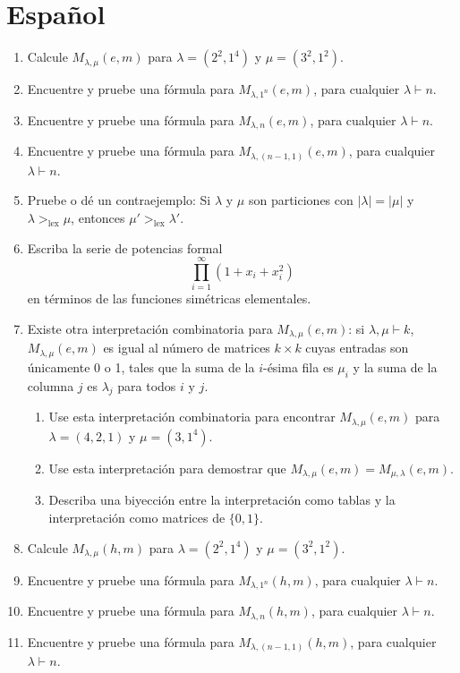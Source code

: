 \documentclass{article}
\begin{document}
\section*{Español}
\begin{enumerate}
\item Calcule $M_{\lambda,\mu}(e,m)$ para $\lambda= (2^2,1^4)$ y $\mu=(3^2,1^2)$.
\item Encuentre y pruebe una fórmula para $M_{\lambda, 1^n}(e,m)$, para cualquier $\lambda \vdash n$.
\item Encuentre y pruebe una fórmula para $M_{\lambda, n}(e,m)$, para cualquier $\lambda \vdash n$.
\item Encuentre y pruebe una fórmula para $M_{\lambda, (n-1,1)}(e,m)$, para cualquier $\lambda \vdash n$.
\item Pruebe o dé un contraejemplo: Si $\lambda$ y $\mu$ son particiones con $|\lambda|=|\mu|$ y $\lambda>_{\text{lex}} \mu$, entonces $\mu'>_{\text{lex}} \lambda'$.
\item Escriba la serie de potencias formal \[ \prod_{i=1}^\infty (1+x_i+x_i^2)\] en términos de las funciones simétricas elementales.
\item Existe otra interpretación combinatoria para $M_{\lambda, \mu} (e, m)$: si $\lambda, \mu \vdash k$, $M_{\lambda, \mu} (e, m)$ es igual al número de matrices $k\times k$ cuyas entradas son únicamente 0 o 1, tales que la suma de la $i$-ésima fila es $\mu_i$ y la suma de la columna $j$ es $\lambda_j$ para todos $i$ y $j$.
\begin{enumerate}
\item Use esta interpretación combinatoria para encontrar $M_{\lambda, \mu}(e, m)$ para $\lambda = (4,2,1)$ y $\mu = (3,1^4)$.
\item Use esta interpretación para demostrar que $M_{\lambda,\mu}(e,m) = M_{\mu,\lambda}(e,m)$.
\item Describa una biyección entre la interpretación como tablas y la interpretación como matrices de $\{0,1\}$.
\end{enumerate}
\item Calcule $M_{\lambda,\mu}(h,m)$ para $\lambda=(2^2,1^4)$ y $\mu=(3^2,1^2)$.
\item Encuentre y pruebe una fórmula para $M_{\lambda, 1^n}(h,m)$, para cualquier $\lambda \vdash n$.
\item Encuentre y pruebe una fórmula para $M_{\lambda, n}(h,m)$, para cualquier $\lambda \vdash n$.
\item Encuentre y pruebe una fórmula para $M_{\lambda, (n-1,1)}(h,m)$, para cualquier $\lambda \vdash n$.

\end{enumerate}
\end{document}
